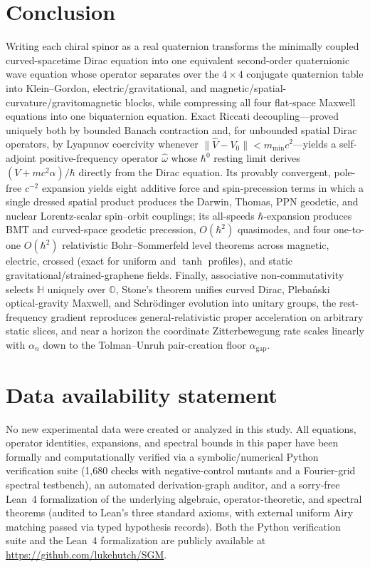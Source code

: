 \documentclass[aps,prd,onecolumn,tightenlines,nofootinbib,notitlepage,10pt,floatfix]{revtex4-2}
\theoremstyle{indentedtheorem}
\begin{document}
\section{Conclusion}
\label{sec:conclusion}

Writing each chiral spinor as a real quaternion transforms the minimally coupled curved-spacetime Dirac equation into one equivalent second-order quaternionic wave equation whose operator separates over the $4\times 4$ conjugate quaternion table into Klein--Gordon, electric/gravitational, and magnetic/spatial-curvature/gravitomagnetic blocks, while compressing all four flat-space Maxwell equations into one biquaternion equation. Exact Riccati decoupling---proved uniquely both by bounded Banach contraction and, for unbounded spatial Dirac operators, by Lyapunov coercivity whenever $\|\hat{V}-V_0\|<m_{\min}c^2$---yields a self-adjoint positive-frequency operator $\hat{\omega}$ whose $\hbar^0$ resting limit derives $(V+mc^2\alpha)/\hbar$ directly from the Dirac equation. Its provably convergent, pole-free $c^{-2}$ expansion yields eight additive force and spin-precession terms in which a single dressed spatial product produces the Darwin, Thomas, PPN geodetic, and nuclear Lorentz-scalar spin--orbit couplings; its all-speeds $\hbar$-expansion produces BMT and curved-space geodetic precession, $O(\hbar^2)$ quasimodes, and four one-to-one $O(\hbar^2)$ relativistic Bohr--Sommerfeld level theorems across magnetic, electric, crossed (exact for uniform and $\tanh$ profiles), and static gravitational/strained-graphene fields. Finally, associative non-commutativity selects $\mathbb{H}$ uniquely over $\mathbb{O}$, Stone's theorem unifies curved Dirac, Pleba\'nski optical-gravity Maxwell, and Schr\"odinger evolution into unitary groups, the rest-frequency gradient reproduces general-relativistic proper acceleration on arbitrary static slices, and near a horizon the coordinate Zitterbewegung rate scales linearly with $\alpha_n$ down to the Tolman--Unruh pair-creation floor $\alpha_\text{gap}$.

\section*{Data availability statement}
No new experimental data were created or analyzed in this study. All equations, operator identities, expansions, and spectral bounds in this paper have been formally and computationally verified via a symbolic/numerical Python verification suite (1,680 checks with negative-control mutants and a Fourier-grid spectral testbench), an automated derivation-graph auditor, and a sorry-free Lean~4 formalization of the underlying algebraic, operator-theoretic, and spectral theorems (audited to Lean's three standard axioms, with external uniform Airy matching passed via typed hypothesis records). Both the Python verification suite and the Lean~4 formalization are publicly available at \url{https://github.com/lukehutch/SGM}.



\end{document}
